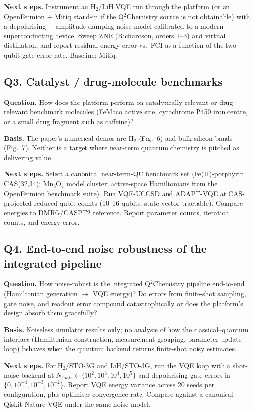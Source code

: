 \textbf{Next steps.} Instrument an H$_2$/LiH VQE run through the
platform (or an OpenFermion + Mitiq stand-in if the Q$^2$Chemistry
source is not obtainable) with a depolarising + amplitude-damping
noise model calibrated to a modern superconducting device. Sweep
ZNE (Richardson, orders 1--3) and virtual distillation, and
report residual energy error vs.\ FCI as a function of the
two-qubit gate error rate. Baseline: Mitiq.

\subsection*{Q3. Catalyst / drug-molecule benchmarks}
\textbf{Question.} How does the platform perform on
catalytically-relevant or drug-relevant benchmark molecules
(FeMoco active site, cytochrome P450 iron centre, or a
small drug fragment such as caffeine)?

\textbf{Basis.} The paper's numerical demos are H$_2$ (Fig.~6)
and bulk silicon bands (Fig.~7). Neither is a target where
near-term quantum chemistry is pitched as delivering value.

\textbf{Next steps.} Select a canonical near-term-QC benchmark
set (Fe(II)-porphyrin CAS(32,34); Mn$_3$O$_4$ model cluster;
active-space Hamiltonians from the OpenFermion benchmark suite).
Run VQE-UCCSD and ADAPT-VQE at CAS-projected reduced qubit counts
(10--16 qubits, state-vector tractable). Compare energies to
DMRG/CASPT2 reference. Report parameter counts, iteration counts,
and energy error.

\subsection*{Q4. End-to-end noise robustness of the integrated
pipeline}
\textbf{Question.} How noise-robust is the integrated
Q$^2$Chemistry pipeline end-to-end (Hamiltonian generation
$\to$ VQE energy)? Do errors from finite-shot sampling, gate
noise, and readout error compound catastrophically or does the
platform's design absorb them gracefully?

\textbf{Basis.} Noiseless simulator results only; no analysis of
how the classical--quantum interface (Hamiltonian construction,
measurement grouping, parameter-update loop) behaves when the
quantum backend returns finite-shot noisy estimates.

\textbf{Next steps.} For H$_2$/STO-3G and LiH/STO-3G, run the VQE
loop with a shot-noise backend at
$N_{\text{shots}} \in \{10^2, 10^3, 10^4, 10^5\}$ and depolarising
gate errors in $\{0, 10^{-4}, 10^{-3}, 10^{-2}\}$. Report VQE
energy variance across 20 seeds per configuration, plus optimiser
convergence rate. Compare against a canonical Qiskit-Nature VQE
under the same noise model.

